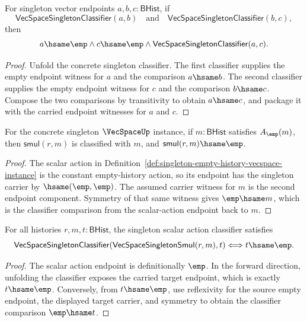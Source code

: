 
\begin{theorem}
\label{thm:vecspace-singleton-classifier-endpoint-trans}
For singleton vector endpoints $a,b,c:\mathsf{BHist}$, if
$$
\mathsf{VecSpaceSingletonClassifier}(a,b)
\quad\text{and}\quad
\mathsf{VecSpaceSingletonClassifier}(b,c),
$$
then
$$
a\hsame\emp\wedge c\hsame\emp\wedge
\mathsf{VecSpaceSingletonClassifier}(a,c).
$$
\end{theorem}
\begin{proof}
Unfold the concrete singleton classifier. The first classifier supplies the
empty endpoint witness for $a$ and the comparison $a\hsame b$. The second
classifier supplies the empty endpoint witness for $c$ and the comparison
$b\hsame c$. Compose the two comparisons by transitivity to obtain
$a\hsame c$, and package it with the carried endpoint witnesses for $a$ and
$c$.
\end{proof}

\begin{theorem}
\label{thm:vecspace-singleton-smul-carrier-readback}
For the concrete singleton $\VecSpaceUp$ instance, if
$m:\mathsf{BHist}$ satisfies $A_{\emp}(m)$, then
$\mathsf{smul}(r,m)$ is classified with $m$, and
$\mathsf{smul}(r,m)\hsame\emp$.
\end{theorem}
\begin{proof}
The scalar action in
Definition~\ref{def:singleton-empty-history-vecspace-instance} is the constant
empty-history action, so its endpoint has the singleton carrier by
$\hsame(\emp,\emp)$. The assumed carrier witness for $m$ is the second endpoint
component. Symmetry of that same witness gives
$\emp\hsame m$, which is the classifier comparison from the scalar-action
endpoint back to $m$.
\end{proof}

\begin{theorem}
\label{thm:vecspace-singleton-smul-classifier-empty-iff}
For all histories $r,m,t:\mathsf{BHist}$, the singleton scalar action
classifier satisfies
$$
\mathsf{VecSpaceSingletonClassifier}
  (\mathsf{VecSpaceSingletonSmul}(r,m),t)
\Longleftrightarrow
t\hsame\emp .
$$
\end{theorem}
\begin{proof}
The scalar action endpoint is definitionally $\emp$. In the forward direction,
unfolding the classifier exposes the carried target endpoint, which is exactly
$t\hsame\emp$. Conversely, from $t\hsame\emp$, use reflexivity for the source
empty endpoint, the displayed target carrier, and symmetry to obtain the
classifier comparison $\emp\hsame t$.
\end{proof}

